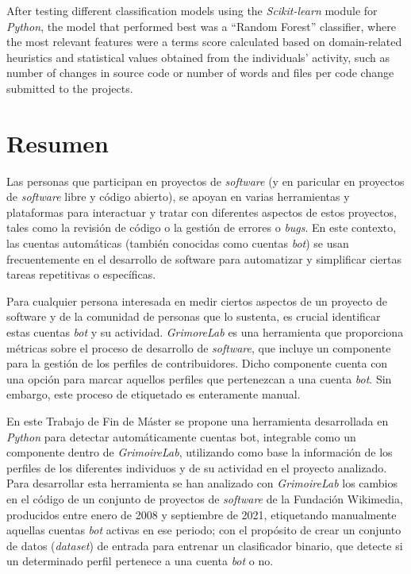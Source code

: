 \documentclass[a4paper, 12pt]{book}
\begin{document}
After testing different classification models using the \emph{Scikit-learn} module for \emph{Python}, the model that performed best was a ``Random Forest'' classifier, where the most relevant features were a terms score calculated based on domain-related heuristics and statistical values obtained from the individuals' activity, such as number of changes in source code or number of words and files per code change submitted to the projects.


\chapter*{Resumen}

Las personas que participan en proyectos de \emph{software} (y en paricular en proyectos de \emph{software} libre y código abierto), se apoyan en varias herramientas y plataformas para interactuar y tratar con diferentes aspectos de estos proyectos, tales como la revisión de código o la gestión de errores o \emph{bugs}. En este contexto, las cuentas automáticas (también conocidas como cuentas \emph{bot}) se usan frecuentemente en el desarrollo de software para automatizar y simplificar ciertas tareas repetitivas o específicas.

Para cualquier persona interesada en medir ciertos aspectos de un proyecto de software y de la comunidad de personas que lo sustenta, es crucial identificar estas cuentas \emph{bot} y su actividad. \emph{GrimoreLab} es una herramienta que proporciona métricas sobre el proceso de desarrollo de \emph{software}, que incluye un componente para la gestión de los perfiles de contribuidores. Dicho componente cuenta con una opción para marcar aquellos perfiles que pertenezcan a una cuenta \emph{bot}. Sin embargo, este proceso de etiquetado es enteramente manual.

En este Trabajo de Fin de Máster se propone una herramienta desarrollada en \emph{Python} para detectar automáticamente cuentas bot, integrable como un componente dentro de \emph{GrimoireLab}, utilizando como base la información de los perfiles de los diferentes individuos y de su actividad en el proyecto analizado. Para desarrollar esta herramienta se han analizado con \emph{GrimoireLab} los cambios en el código de un conjunto de proyectos de \emph{software} de la Fundación Wikimedia, producidos entre enero de 2008 y septiembre de 2021, etiquetando manualmente aquellas cuentas \emph{bot} activas en ese periodo; con el propósito de crear un conjunto de datos (\emph{dataset}) de entrada para entrenar un clasificador binario, que detecte si un determinado perfil pertenece a una cuenta \emph{bot} o no.
\end{document}
